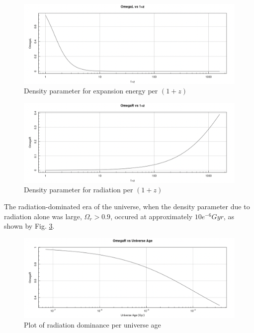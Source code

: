 \documentclass{paper}
\begin{document}
\begin{enumerate}
      \begin{figure}[H]
        \includegraphics[width=\linewidth]{omega-l.png}
        \caption{Density parameter for expansion energy per \((1+z)\)}
        \label{fig:omega-l}
      \end{figure}

      \begin{figure}[H]
        \includegraphics[width=\linewidth]{omega-r.png}
        \caption{Density parameter for radiation per \((1+z)\)}
        \label{fig:omega-r}
      \end{figure}

      The radiation-dominated era of the universe, when the density
      parameter due to radiation alone was large, \(\Omega_r > 0.9\),
      occured at approximately \(10e^{-6} \si{Gyr}\), as shown by Fig.
      \ref{fig:radiation-age}.

      \begin{figure}[H]
        \includegraphics[width=\linewidth]{radiation-age.png}
        \caption{Plot of radiation dominance per universe age}
        \label{fig:radiation-age}
      \end{figure}


\end{enumerate}
\end{document}
